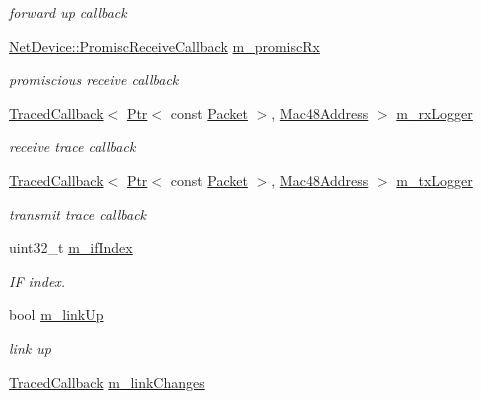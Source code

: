 \begin{DoxyCompactItemize}
\begin{DoxyCompactList}\small\item\em forward up callback \end{DoxyCompactList}\item 
\hyperlink{classns3_1_1NetDevice_a427225795919f26c414bee2ea3f31ed2}{Net\+Device\+::\+Promisc\+Receive\+Callback} \hyperlink{classns3_1_1WifiNetDevice_a7e0b171d92c73b6d576ce1bfa0a115dd}{m\+\_\+promisc\+Rx}
\begin{DoxyCompactList}\small\item\em promiscious receive callback \end{DoxyCompactList}\item 
\hyperlink{classns3_1_1TracedCallback}{Traced\+Callback}$<$ \hyperlink{classns3_1_1Ptr}{Ptr}$<$ const \hyperlink{classns3_1_1Packet}{Packet} $>$, \hyperlink{classns3_1_1Mac48Address}{Mac48\+Address} $>$ \hyperlink{classns3_1_1WifiNetDevice_adaab9495c7cc9ceb8d9fc60ddf5d2fbf}{m\+\_\+rx\+Logger}
\begin{DoxyCompactList}\small\item\em receive trace callback \end{DoxyCompactList}\item 
\hyperlink{classns3_1_1TracedCallback}{Traced\+Callback}$<$ \hyperlink{classns3_1_1Ptr}{Ptr}$<$ const \hyperlink{classns3_1_1Packet}{Packet} $>$, \hyperlink{classns3_1_1Mac48Address}{Mac48\+Address} $>$ \hyperlink{classns3_1_1WifiNetDevice_a59c4566f20a0a4d78cd6e1ec90ea9b5e}{m\+\_\+tx\+Logger}
\begin{DoxyCompactList}\small\item\em transmit trace callback \end{DoxyCompactList}\item 
uint32\+\_\+t \hyperlink{classns3_1_1WifiNetDevice_a40970e3141c0ab68c7482f960ebf3bfa}{m\+\_\+if\+Index}
\begin{DoxyCompactList}\small\item\em IF index. \end{DoxyCompactList}\item 
bool \hyperlink{classns3_1_1WifiNetDevice_abcf67f62ae181e80b046bcf18e5818a6}{m\+\_\+link\+Up}
\begin{DoxyCompactList}\small\item\em link up \end{DoxyCompactList}\item 
\hyperlink{classns3_1_1TracedCallback}{Traced\+Callback} \hyperlink{classns3_1_1WifiNetDevice_a85c0fb1cb2654801447fb9f9b7cc21d5}{m\+\_\+link\+Changes}

\end{DoxyCompactItemize}

